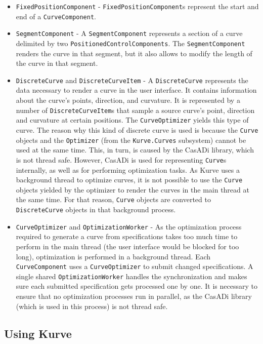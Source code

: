 \documentclass[a4paper]{article}
\begin{document}
\begin{itemize}
					\item \verb|FixedPositionComponent| - \verb|FixedPositionComponent|s represent the start and end of a \verb|CurveComponent|.
					\item \verb|SegmentComponent| - A \verb|SegmentComponent| represents a section of a curve delimited by two \verb|PositionedControlComponents|. The \verb|SegmentComponent| renders the curve in that segment, but it also allows to modify the length of the curve in that segment.
					\item \verb|DiscreteCurve| and \verb|DiscreteCurveItem| - A \verb|DiscreteCurve| represents the data necessary to render a curve in the user interface. It contains information about the curve's points, direction, and curvature. It is represented by a number of \verb|DiscreteCurveItem|s that sample a source curve's point, direction and curvature at certain positions. 
					The \verb|CurveOptimizer| yields this type of curve. The reason why this kind of discrete curve is used is because the \verb|Curve| objects and the \verb|Optimizer| (from the \verb|Kurve.Curves| subsystem) cannot be used at the same time. This, in turn, is caused by the CasADi library, which is not thread safe. However, CasADi is used for representing \verb|Curve|s internally, as well as for performing optimization tasks.
					As Kurve uses a background thread to optimize curves, it is not possible to use the \verb|Curve| objects yielded by the optimizer to render the curves in the main thread at the same time. For that reason, \verb|Curve| objects are converted to \verb|DiscreteCurve| objects in that background process.
					\item \verb|CurveOptimizer| and \verb|OptimizationWorker| - As the optimization process required to generate a curve from specifications takes too much time to perform in the main thread (the user interface would be blocked for too long), optimization is performed in a background thread. Each \verb|CurveComponent| uses a \verb|CurveOptimizer| to submit changed specifications. A single shared \verb|OptimizationWorker| handles the synchronization and makes sure each submitted specification gets processed one by one. It is necessary to ensure that no optimization processes run in parallel, as the CasADi library (which is used in this process) is not thread safe.
				\end{itemize}

			\subsection{Using Kurve}
				
\end{document}
